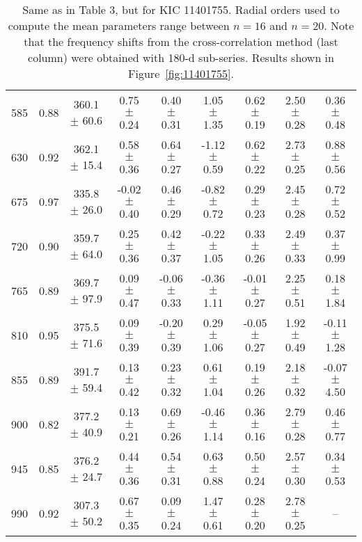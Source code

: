 \documentclass[twocolumn]{aastex61}%
\begin{document}
\begin{table*}[ht]
\begin{tabular}{ccc|ccccc|c}
585 & 0.88 & 360.1 $\pm$ 60.6 & 0.75 $\pm$ 0.24 & 0.40 $\pm$ 0.31 & 1.05 $\pm$ 1.35 & 0.62 $\pm$ 0.19 & 2.50 $\pm$ 0.28 & 0.36 $\pm$ 0.48\\
630 & 0.92 & 362.1 $\pm$ 15.4 & 0.58 $\pm$ 0.36 & 0.64 $\pm$ 0.27 & -1.12 $\pm$ 0.59 & 0.62 $\pm$ 0.22 & 2.73 $\pm$ 0.25 & 0.88 $\pm$ 0.56\\
675 & 0.97 & 335.8 $\pm$ 26.0 & -0.02 $\pm$ 0.40 & 0.46 $\pm$ 0.29 & -0.82 $\pm$ 0.72 & 0.29 $\pm$ 0.23 & 2.45 $\pm$ 0.28 & 0.72 $\pm$ 0.52\\
720 & 0.90 & 359.7 $\pm$ 64.0 & 0.25 $\pm$ 0.36 & 0.42 $\pm$ 0.37 & -0.22 $\pm$ 1.05 & 0.33 $\pm$ 0.26 & 2.49 $\pm$ 0.33 & 0.37 $\pm$ 0.99\\
765 & 0.89 & 369.7 $\pm$ 97.9 & 0.09 $\pm$ 0.47 & -0.06 $\pm$ 0.33 & -0.36 $\pm$ 1.11 & -0.01 $\pm$ 0.27 & 2.25 $\pm$ 0.51 & 0.18 $\pm$ 1.84\\
810 & 0.95 & 375.5 $\pm$ 71.6 & 0.09 $\pm$ 0.39 & -0.20 $\pm$ 0.39 & 0.29 $\pm$ 1.06 & -0.05 $\pm$ 0.27 & 1.92 $\pm$ 0.49 & -0.11 $\pm$ 1.28\\
855 & 0.89 & 391.7 $\pm$ 59.4 & 0.13 $\pm$ 0.42 & 0.23 $\pm$ 0.32 & 0.61 $\pm$ 1.04 & 0.19 $\pm$ 0.26 & 2.18 $\pm$ 0.32 & -0.07 $\pm$ 4.50\\
900 & 0.82 & 377.2 $\pm$ 40.9 & 0.13 $\pm$ 0.21 & 0.69 $\pm$ 0.26 & -0.46 $\pm$ 1.14 & 0.36 $\pm$ 0.16 & 2.79 $\pm$ 0.28 & 0.46 $\pm$ 0.77\\
945 & 0.85 & 376.2 $\pm$ 24.7 & 0.44 $\pm$ 0.36 & 0.54 $\pm$ 0.31 & 0.63 $\pm$ 0.88 & 0.50 $\pm$ 0.24 & 2.57 $\pm$ 0.30 & 0.34 $\pm$ 0.53\\
990 & 0.92 & 307.3 $\pm$ 50.2 & 0.67 $\pm$ 0.35 & 0.09 $\pm$ 0.24 & 1.47 $\pm$ 0.61 & 0.28 $\pm$ 0.20 & 2.78 $\pm$ 0.25 & --\\
\end{tabular}
\caption{Same as in Table 3, but for KIC 11401755. {Radial orders used to compute the mean parameters range between $n=16$ and $n=20$.} Note that the frequency shifts from the cross-correlation method (last column) were obtained with 180-d sub-series. Results shown in Figure~\ref{fig:11401755}.}\label{tab:11401755}\vspace{-1.5cm}
\end{table*}
\end{document}
